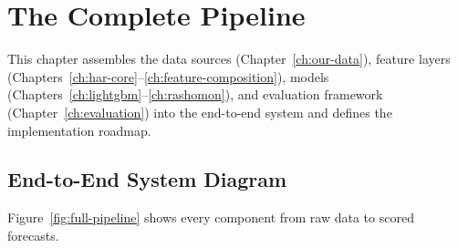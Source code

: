 \chapter{The Complete Pipeline}
\label{ch:complete-pipeline}

This chapter assembles the data sources (Chapter~\ref{ch:our-data}), feature layers (Chapters~\ref{ch:har-core}--\ref{ch:feature-composition}), models (Chapters~\ref{ch:lightgbm}--\ref{ch:rashomon}), and evaluation framework (Chapter~\ref{ch:evaluation}) into the end-to-end system and defines the implementation roadmap.

\section{End-to-End System Diagram}
\label{sec:system-diagram}

Figure~\ref{fig:full-pipeline} shows every component from raw data to scored forecasts.

